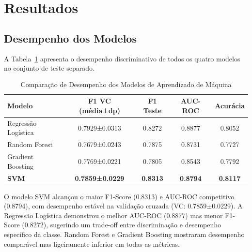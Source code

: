 
\section{Resultados}

\subsection{Desempenho dos Modelos}

A Tabela~\ref{tab:performance} apresenta o desempenho discriminativo de 
todos os quatro modelos no conjunto de teste separado.

\begin{table}[H]
\centering
\caption{Comparação de Desempenho dos Modelos de Aprendizado de Máquina}
\begin{tabular}{lcccc}
\toprule
\textbf{Modelo} & \textbf{F1 VC (média±dp)} & \textbf{F1 Teste} & 
\textbf{AUC-ROC} & \textbf{Acurácia} \\
\midrule
Regressão Logística & 0.7929±0.0313 & 0.8272 & 0.8877 & 0.8052 \\
Random Forest & 0.7679±0.0243 & 0.7875 & 0.8731 & 0.7727 \\
Gradient Boosting & 0.7769±0.0221 & 0.7805 & 0.8543 & 0.7792 \\
\textbf{SVM} & \textbf{0.7859±0.0229} & \textbf{0.8313} & \textbf{0.8794} & \textbf{0.8117} \\
\bottomrule
\end{tabular}
\label{tab:performance}
\end{table}

O modelo SVM alcançou o maior F1-Score (0.8313) e AUC-ROC competitivo 
(0.8794), com desempenho estável na validação cruzada (VC: 0.7859$\pm$0.0229). 
A Regressão Logística demonstrou o melhor AUC-ROC (0.8877) mas menor 
F1-Score (0.8272), sugerindo um trade-off entre discriminação e desempenho 
específico da classe. Random Forest e Gradient Boosting mostraram desempenho 
comparável mas ligeiramente inferior em todas as métricas.

